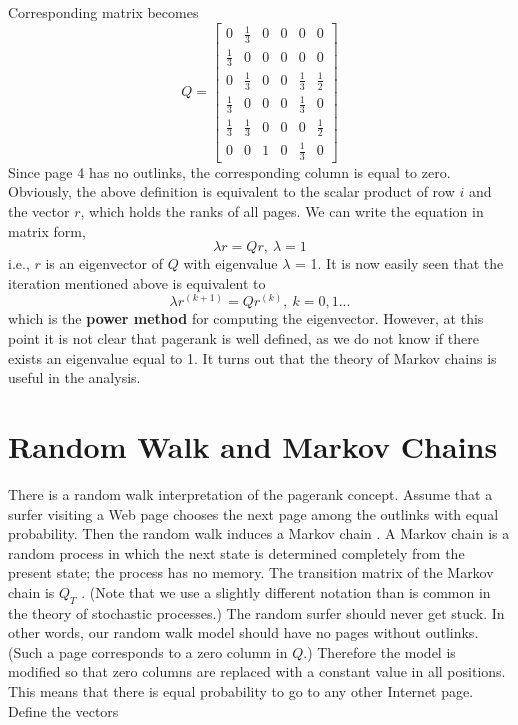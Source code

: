 \documentclass[a4paper]{article}
\begin{document}
Corresponding matrix becomes
$$
Q = \begin{bmatrix}
0 & \frac{1}{3} & 0 & 0 & 0 & 0\\
\frac{1}{3} & 0 & 0 & 0 & 0 & 0\\
0 & \frac{1}{3} & 0 & 0 & \frac{1}{3} & \frac{1}{2}\\
\frac{1}{3} & 0 & 0 & 0 & \frac{1}{3} & 0\\
\frac{1}{3} &\frac{1}{3} & 0 & 0 & 0 & \frac{1}{2}\\
0 & 0 & 1 & 0 & \frac{1}{3} & 0
\end{bmatrix}$$
Since page 4 has no outlinks, the corresponding column is equal to zero.
Obviously, the above definition is equivalent to the scalar product of row $i$
and the vector $r$, which holds the ranks of all pages. We can write the equation in matrix form,
$$ \lambda r = Q r,\ \lambda = 1$$
i.e., $r$ is an eigenvector of $Q$ with eigenvalue $\lambda$ = 1. It is now easily seen that the
iteration mentioned above is equivalent to
$$ \lambda r^{(k+1)} = Q r^{(k)},\ k= 0, 1...$$
which is the \textbf{power method} for computing the eigenvector. However, at this point
it is not clear that pagerank is well defined, as we do not know if there exists an
eigenvalue equal to 1. It turns out that the theory of Markov chains is useful in the
analysis.
\newpage
\section{Random Walk and Markov Chains} %
\label{sec:section_about_quotations}
There is a random walk interpretation of the pagerank concept. Assume that a
surfer visiting a Web page chooses the next page among the outlinks with equal
probability. Then the random walk induces a Markov chain . A
Markov chain is a random process in which the next state is determined completely
from the present state; the process has no memory. The transition matrix of the
Markov chain is $Q_T$ . (Note that we use a slightly different notation than is common
in the theory of stochastic processes.)
The random surfer should never get stuck. In other words, our random walk
model should have no pages without outlinks. (Such a page corresponds to a zero
column in $Q$.) Therefore the model is modified so that zero columns are replaced
with a constant value in all positions. This means that there is equal probability to
go to any other Internet page. Define the vectors
\end{document}
